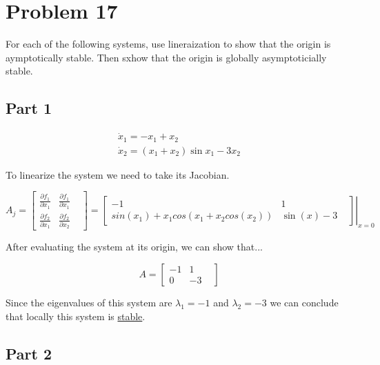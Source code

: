 \section*{Problem 17}


For each of the following systems, use lineraization to show that the origin is aymptotically stable. Then sxhow that the origin is globally asymptoticially stable.

\subsection*{Part 1}
$$
\begin{array}{l}
\dot{x}_{1}=-x_{1}+x_{2} \\
\dot{x}_{2}=\left(x_{1}+x_{2}\right) \sin x_{1}-3 x_{2}
\end{array}
$$


\noindent To linearize the system we need to take its Jacobian.


$$
A_j =
\begin{bmatrix}
  \frac{\partial f_{1}}{\partial x_{1}} & \frac{\partial f_{1}}{\partial x_{1}} & \\

  \frac{\partial f_{2}}{\partial x_{1}} & \frac{\partial f_{2}}{\partial x_{2}}&
\end{bmatrix}
=
\left .
\begin{bmatrix}

-1 & 1 & \\

  sin(x_1) + x_1cos(x_1 + x_2cos(x_2))  & \sin (x)-3&

\end{bmatrix} \right\rvert_{x=0}
$$


\noindent After evaluating the system at its origin, we can show that...

$$
A = \begin{bmatrix}
-1 & 1 & \\
0 & -3 &
\end{bmatrix}
$$


\noindent Since the eigenvalues of this system are $\lambda_1 = -1$ and $\lambda_2 = -3$ we can conclude that locally this system is \underline{stable}.











\subsection*{Part 2}


